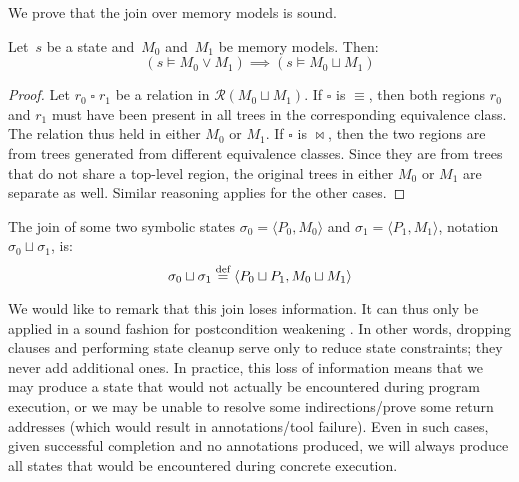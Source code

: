 We prove that the join over memory models is sound.
\begin{lemma}\label{lem:mem_soundness}
  Let~$s$ be a state and~$M_0$ and~$M_1$ be memory models. Then:
  \begin{equation*}
    (s\models M_0 \vee M_1) \implies (s\models M_0\sqcup M_1)
  \end{equation*}
\end{lemma}
\begin{proof}
  Let $r_0\mathbin{\square}r_1$ be a relation in $\mathcal{R}(M_0 \sqcup M_1)$.
  If $\square$ is $\equiv$, then both regions $r_0$ and $r_1$ must have been present in all trees in the corresponding equivalence class.
  The relation thus held in either $M_0$ or $M_1$.
  If $\square$ is $\bowtie$, then the two regions are from trees generated from different equivalence classes. Since they are from trees that do not share a top-level region, the original trees in either $M_0$ or $M_1$ are separate as well.
  Similar reasoning applies for the other cases.
\end{proof}


\begin{definition}
  The join of some two symbolic states $\sigma_0=\langle P_0,M_0\rangle$
  and $\sigma_1=\langle P_1,M_1\rangle$, notation $\sigma_0 \sqcup \sigma_1$, is:
  \begin{equation*}
    \sigma_0 \sqcup \sigma_1 \stackrel{\text{def}}{=} \langle P_0\sqcup P_1,M_0\sqcup M_1\rangle
  \end{equation*}
\end{definition}

We would like to remark that this join loses information.
It can thus only be applied in a sound fashion for postcondition weakening \autocite{hoare1969axiomatic}.
In other words, dropping clauses and performing state cleanup
serve only to reduce state constraints; they never add additional ones.
In practice, this loss of information means that we may produce a state
that would not actually be encountered during program execution,
or we may be unable to resolve some indirections/prove some return addresses
(which would result in annotations/tool failure).
Even in such cases, given successful completion and no annotations produced,
we will always produce all states that would be encountered during concrete execution.

